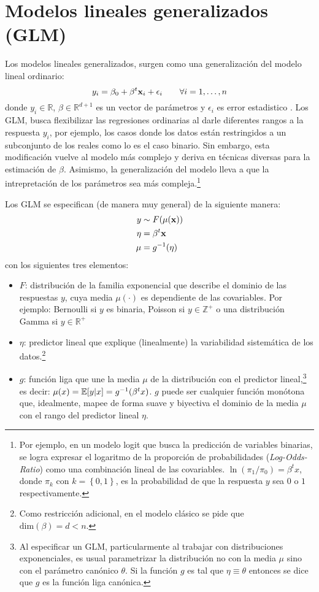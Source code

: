 \documentclass[../Main/Main.tex]{subfiles}
\begin{document}
\section{Modelos lineales generalizados (GLM)} \label{sec:GLM}
Los modelos lineales generalizados, surgen como una generalización del modelo lineal ordinario:
$$y_i = \beta_0 + \beta^t\mathbf{x}_i + \epsilon_i \qquad \forall i=1,\ldots,n$$ donde $y_i \in\mathbb{R}$, $\beta \in \mathbb{R}^{d+1}$ es un vector de parámetros y $\epsilon_i$ es error estadistico \autocite{sundberg2016exponential}. Los GLM, busca flexibilizar las regresiones ordinarias al darle diferentes rangos a la respuesta $y_i$, por ejemplo, los casos donde los datos están restringidos a un subconjunto de los reales como lo es el caso binario. Sin embargo, esta modificación vuelve al modelo más complejo y deriva en técnicas diversas para la estimación de $\beta$. Asimismo, la generalización del modelo lleva a que la intrepretación de los parámetros sea más compleja.\footnote{Por ejemplo, en un modelo logit que busca la predicción de variables binarias, se logra expresar el logaritmo de la proporción de probabilidades (\textit{Log-Odds-Ratio}) como una combinación lineal de las covariables. $\ln(\pi_1 / \pi_0) = \beta^t x$, donde $\pi_k$ con  $k = \left\{0,1\right\}$, es la probabilidad de que la respuesta $y$ sea $0$ o $1$ respectivamente.}

Los GLM se especifican (de manera muy general) de la siguiente manera:
\begin{align} 
	y &\sim F(\mu(\mathbf{x})) \label{ec:GLM} \\ 
	\eta &= \beta^t\mathbf{x} \nonumber \\ 
	\mu &= g^{-1}(\eta) \nonumber
\end{align}
con los siguientes tres elementos:

\begin{itemize}[label={}]
	\item $F$: distribución de la familia exponencial que describe el dominio de las respuestas $y$, cuya media $\mu(\cdot)$ es dependiente de las covariables. Por ejemplo: Bernoulli si $y$ es binaria, Poisson si $y \in \mathbb{Z}^+$ o una distribución Gamma si $y \in \mathbb{R}^+$
	\item $\eta$: predictor lineal que explique (linealmente) la variabilidad sistemática de los datos.\footnote{Como restricción adicional, en el modelo clásico se pide que $\text{dim}(\beta) = d < n.$}
	\item $g$: función liga que une la media $\mu$ de la distribución con el predictor lineal,\footnote{Al especificar un GLM, particularmente al trabajar con distribuciones exponenciales, es usual parametrizar la distribución no con la media $\mu$ sino con el parámetro canónico $\theta$. Si la función $g$ es tal que $\eta \equiv \theta$ entonces se dice que $g$ es la función liga canónica. } es decir: $\mu(x) = \mathbb{E}[y|x] = g^{-1}(\beta^tx)$. $g$ puede ser cualquier función monótona que, idealmente, mapee de forma suave y biyectiva el dominio de la media $\mu$ con el rango del predictor lineal $\eta$. 
\end{itemize}
\end{document}

